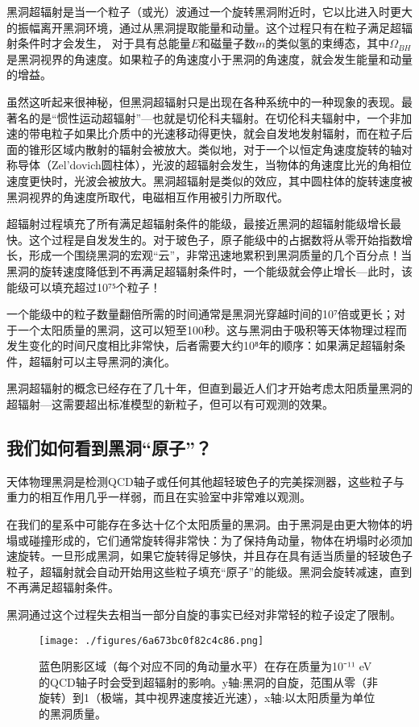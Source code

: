 黑洞超辐射是当一个粒子（或光）波通过一个旋转黑洞附近时，它以比进入时更大的振幅离开黑洞环境，通过从黑洞提取能量和动量。这个过程只有在粒子满足超辐射条件时才会发生，
对于具有总能量$E$和磁量子数$m$的类似氢的束缚态，其中$\Omega_{BH}$是黑洞视界的角速度。如果粒子的角速度小于黑洞的角速度，就会发生能量和动量的增益。

虽然这听起来很神秘，但黑洞超辐射只是出现在各种系统中的一种现象的表现。最著名的是“惯性运动超辐射”—也就是切伦科夫辐射。在切伦科夫辐射中，一个非加速的带电粒子如果比介质中的光速移动得更快，就会自发地发射辐射，而在粒子后面的锥形区域内散射的辐射会被放大。类似地，对于一个以恒定角速度旋转的轴对称导体（Zel’dovich圆柱体），光波的超辐射会发生，当物体的角速度比光的角相位速度更快时，光波会被放大。黑洞超辐射是类似的效应，其中圆柱体的旋转速度被黑洞视界的角速度所取代，电磁相互作用被引力所取代。

超辐射过程填充了所有满足超辐射条件的能级，最接近黑洞的超辐射能级增长最快。这个过程是自发发生的。对于玻色子，原子能级中的占据数将从零开始指数增长，形成一个围绕黑洞的宏观“云”，非常迅速地累积到黑洞质量的几个百分点！当黑洞的旋转速度降低到不再满足超辐射条件时，一个能级就会停止增长—此时，该能级可以填充超过10⁷⁵个粒子！

一个能级中的粒子数量翻倍所需的时间通常是黑洞光穿越时间的10⁷倍或更长；对于一个太阳质量的黑洞，这可以短至100秒。这与黑洞由于吸积等天体物理过程而发生变化的时间尺度相比非常快，后者需要大约10⁸年的顺序：如果满足超辐射条件，超辐射可以主导黑洞的演化。

黑洞超辐射的概念已经存在了几十年，但直到最近人们才开始考虑太阳质量黑洞的超辐射—这需要超出标准模型的新粒子，但可以有可观测的效果。

\subsection{我们如何看到黑洞“原子”？}

天体物理黑洞是检测QCD轴子或任何其他超轻玻色子的完美探测器，这些粒子与重力的相互作用几乎一样弱，而且在实验室中非常难以观测。

在我们的星系中可能存在多达十亿个太阳质量的黑洞。由于黑洞是由更大物体的坍塌或碰撞形成的，它们通常旋转得非常快：为了保持角动量，物体在坍塌时必须加速旋转。一旦形成黑洞，如果它旋转得足够快，并且存在具有适当质量的轻玻色子粒子，超辐射就会自动开始用这些粒子填充“原子”的能级。黑洞会旋转减速，直到不再满足超辐射条件。

黑洞通过这个过程失去相当一部分自旋的事实已经对非常轻的粒子设定了限制。

\begin{figure}[ht]
\centering
\texttt{[image: ./figures/6a673bc0f82c4c86.png]}
\caption{蓝色阴影区域（每个对应不同的角动量水平）在存在质量为10⁻¹¹ eV的QCD轴子时会受到超辐射的影响。y轴:黑洞的自旋，范围从零（非旋转）到1（极端，其中视界速度接近光速），x轴:以太阳质量为单位的黑洞质量。} \label{fig_GAtom_3}
\end{figure}

